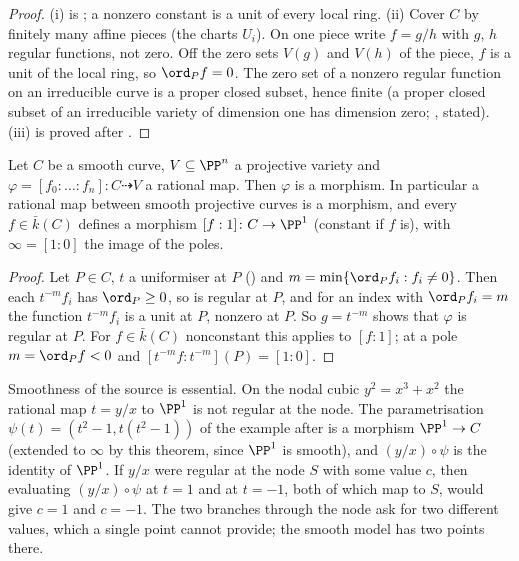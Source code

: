 \begin{proof}
(i) is ; a nonzero constant is a unit of every local ring. (ii) Cover $C$ by finitely many affine pieces (the charts
$U_i$). On one piece write $f=g/h$ with $g$, $h$ regular functions, not zero. Off the zero sets $V(g)$ and $V(h)$ of the piece, $f$ is a unit of the
local ring, so $\ord_Pf=0$. The zero set of a nonzero regular function on an irreducible curve is a proper closed subset, hence finite (a proper
closed subset of an irreducible variety of dimension one has dimension zero; \cite[Chapter I, Section 1]{Hartshorne}, stated). (iii) is proved
after .
\end{proof}

\begin{theorem}\label{thm:curves:extend-morphism}
Let $C$ be a smooth curve, $V\subseteq\PP^n$ a projective variety and $\varphi=[f_0:\dots:f_n]\colon C\dashrightarrow V$ a rational map. Then $\varphi$ is a morphism.
In particular a rational map between smooth projective curves is a morphism, and every $f\in\bar k(C)$ defines a morphism $[f:1]\colon C\to\PP^1$
(constant if $f$ is), with $\infty=[1:0]$ the image of the poles.
\end{theorem}

\begin{proof}
Let $P\in C$, $t$ a uniformiser at $P$ () and $m=\min\{\ord_Pf_i:f_i\ne0\}$. Then each $t^{-m}f_i$ has $\ord_P\ge0$, so is
regular at $P$, and for an index with $\ord_Pf_i=m$ the function $t^{-m}f_i$ is a unit at $P$, nonzero at $P$. So $g=t^{-m}$ shows that $\varphi$ is regular
at $P$. For $f\in\bar k(C)$ nonconstant this applies to $[f:1]$; at a pole $m=\ord_Pf<0$ and $[t^{-m}f:t^{-m}](P)=[1:0]$.
\end{proof}

Smoothness of the source is essential. On the nodal cubic $y^2=x^3+x^2$ the rational map $t=y/x$ to $\PP^1$ is not regular at the node. The parametrisation
$\psi(t)=(t^2-1,t(t^2-1))$ of the example after  is a morphism $\PP^1\to C$ (extended to $\infty$ by this theorem, since $\PP^1$ is smooth), and
$(y/x)\circ\psi$ is the identity of $\PP^1$. If $y/x$ were regular at the node $S$ with some value $c$, then evaluating $(y/x)\circ\psi$ at $t=1$ and at $t=-1$,
both of which map to $S$, would give $c=1$ and $c=-1$. The two branches through the node ask for two different values, which a single point cannot
provide; the smooth model has two points there.

